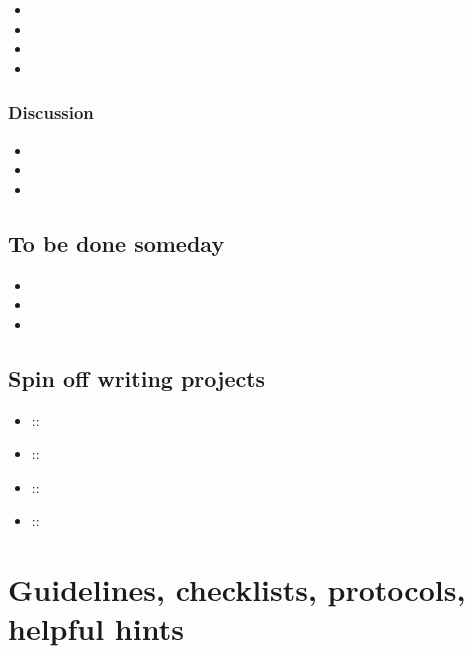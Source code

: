 \documentclass[11pt,letterpaper]{article}
\begin{document}
\begin{itemize}
\item 

\item 

\item 

\item 
\end{itemize}

\subsubsection{Discussion}
\label{sec:org39c8298}


\begin{itemize}
\item 

\item 

\item 
\end{itemize}

\subsection{To be done someday}
\label{sec:org73f9ca1}


\begin{itemize}
\item 

\item 

\item 
\end{itemize}

\subsection{Spin off writing projects}
\label{sec:org7bfe879}


\begin{itemize}
\item ::
\item ::
\item ::
\item ::
\end{itemize}


\section{Guidelines, checklists, protocols, helpful hints}
\label{sec:org0bb785d}
\end{document}
